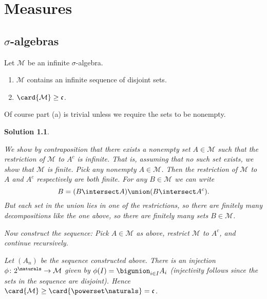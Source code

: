 \documentclass[article, a4paper, 11pt, oneside]{memoir}
\title{\doctitle}
\author{\docauthor}
\numberwithin{equation}{chapter}
\newcommand{\calM}{\mathcal{M}}
\theoremstyle{nonumberplain}
\newtheorem{solution}{Solution}
\begin{document}
\maketitle

\chapter{Measures}

\addtocounter{section}{1}
\section[Sigma-algebras][$\sigma$-algebras]{$\sigma$-algebras}

\begin{exerciseframed*}[1]
    Let $\calM$ be an infinite $\sigma$-algebra.
    \begin{enumerate}
        \item $\calM$ contains an infinite sequence of disjoint sets.
        \item $\card{\calM} \geq \mathfrak{c}$.
    \end{enumerate}
\end{exerciseframed*}
%
Of course part (a) is trivial unless we require the sets to be nonempty.

\begin{solution}
\begin{solutionsec}
	\item We show by contraposition that there exists a nonempty set $A \in \calM$ such that the restriction of $\calM$ to $A^c$ is infinite. That is, assuming that no such set exists, we show that $\calM$ is finite. Pick any nonempty $A \in \calM$. Then the restriction of $\calM$ to $A$ and $A^c$ respectively are both finite. For any $B \in \calM$ we can write
	\begin{equation*}
		B = (B \intersect A) \union (B \intersect A^c).
	\end{equation*}
	But each set in the union lies in one of the restrictions, so there are finitely many decompositions like the one above, so there are finitely many sets $B \in \calM$.
	
	Now construct the sequence: Pick $A \in \calM$ as above, restrict $\calM$ to $A^c$, and continue recursively.
	
	\item Let $(A_n)$ be the sequence constructed above. There is an injection $\phi\colon 2^\naturals \to \calM$ given by $\phi(I) = \bigunion_{i \in I} A_i$ (injectivity follows since the sets in the sequence are disjoint). Hence $\card{\calM} \geq \card{\powerset\naturals} = \mathfrak{c}$.
\end{solutionsec}
\end{solution}
\end{document}
